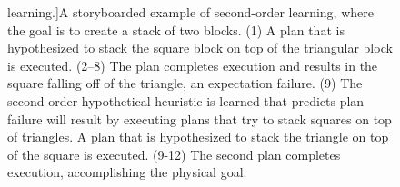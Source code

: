 \begin{figure}
  learning.]{A storyboarded example of second-order learning, where
  the goal is to create a stack of two blocks.  (1) A plan that is
  hypothesized to stack the square block on top of the triangular
  block is executed.  (2--8) The plan completes execution and results
  in the square falling off of the triangle, an expectation failure.
  (9) The second-order hypothetical heuristic is learned that predicts
  plan failure will result by executing plans that try to stack
  squares on top of triangles.  A plan that is hypothesized to stack
  the triangle on top of the square is executed.  (9-12) The second
  plan completes execution, accomplishing the physical goal.}
\label{figure:implemented_example_learning_storyboard}
\end{figure}

